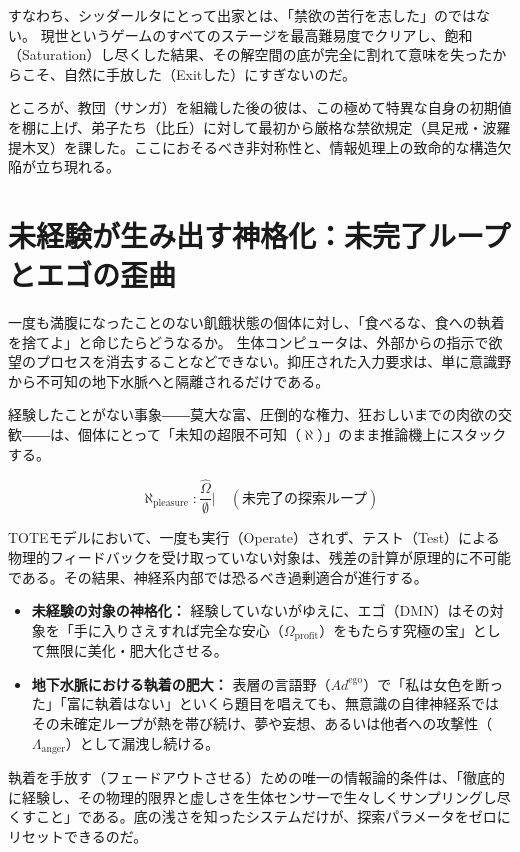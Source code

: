 すなわち、シッダールタにとって出家とは、「禁欲の苦行を志した」のではない。
現世というゲームのすべてのステージを最高難易度でクリアし、飽和（Saturation）し尽くした結果、その解空間の底が完全に割れて意味を失ったからこそ、自然に手放した（Exitした）にすぎないのだ。

ところが、教団（サンガ）を組織した後の彼は、この極めて特異な自身の初期値を棚に上げ、弟子たち（比丘）に対して最初から厳格な禁欲規定（具足戒・波羅提木叉）を課した。ここにおそるべき非対称性と、情報処理上の致命的な構造欠陥が立ち現れる。

\section{未経験が生み出す神格化：未完了ループとエゴの歪曲}

一度も満腹になったことのない飢餓状態の個体に対し、「食べるな、食への執着を捨てよ」と命じたらどうなるか。
生体コンピュータは、外部からの指示で欲望のプロセスを消去することなどできない。抑圧された入力要求は、単に意識野から不可知の地下水脈へと隔離されるだけである。

経験したことがない事象――莫大な富、圧倒的な権力、狂おしいまでの肉欲の交歓――は、個体にとって「未知の超限不可知（$\aleph$）」のまま推論機上にスタックする。

\begin{equation}
\aleph_{\mathrm{pleasure}} : \frac{\hat{\Omega}}{\emptyset} \Big| \quad (\text{未完了の探索ループ})
\end{equation}

TOTEモデルにおいて、一度も実行（Operate）されず、テスト（Test）による物理的フィードバックを受け取っていない対象は、残差の計算が原理的に不可能である。その結果、神経系内部では恐るべき過剰適合が進行する。

\begin{itemize}
  \item \textbf{未経験の対象の神格化：} 経験していないがゆえに、エゴ（DMN）はその対象を「手に入りさえすれば完全な安心（$\Omega_{\mathrm{profit}}$）をもたらす究極の宝」として無限に美化・肥大化させる。
  \item \textbf{地下水脈における執着の肥大：} 表層の言語野（$Ad^{\mathrm{ego}}$）で「私は女色を断った」「富に執着はない」といくら題目を唱えても、無意識の自律神経系ではその未確定ループが熱を帯び続け、夢や妄想、あるいは他者への攻撃性（$\Lambda_{\mathrm{anger}}$）として漏洩し続ける。
\end{itemize}

執着を手放す（フェードアウトさせる）ための唯一の情報論的条件は、「徹底的に経験し、その物理的限界と虚しさを生体センサーで生々しくサンプリングし尽くすこと」である。底の浅さを知ったシステムだけが、探索パラメータをゼロにリセットできるのだ。

